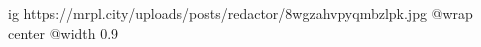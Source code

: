  
 
 
 
 

\ifcmt
  ig https://mrpl.city/uploads/posts/redactor/8wgzahvpyqmbzlpk.jpg
  @wrap center
  @width 0.9
\fi
